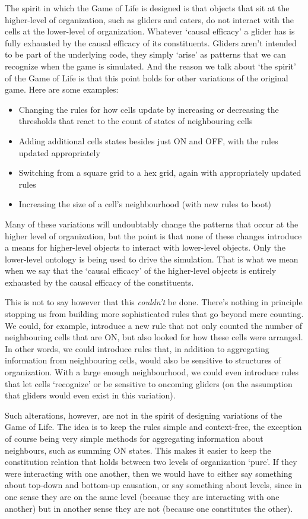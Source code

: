 \documentclass[11pt]{article}
\begin{document}
The spirit in which the Game of Life is designed is that objects that sit at the higher-level of organization, such as gliders and eaters, do not interact with the cells at the lower-level of organization.  Whatever `causal efficacy' a glider has is fully exhausted by the causal efficacy of its constituents. Gliders aren't intended to be part of the underlying code, they simply `arise' as patterns that we can recognize when the game is simulated.  And the reason we talk about `the spirit' of the Game of Life is that this point holds for other variations of the original game.  Here are some examples:
\begin{itemize}
	\item Changing the rules for how cells update by increasing or decreasing the thresholds that react to the count of states of neighbouring cells
	\item Adding additional cells states besides just ON and OFF, with the rules updated appropriately
	\item Switching from a square grid to a hex grid, again with appropriately updated rules
	\item Increasing the size of a cell's neighbourhood (with new rules to boot)
\end{itemize}
Many of these variations will undoubtably change the patterns that occur at the higher level of organization, but the point is that none of these changes introduce a means for higher-level objects to interact with lower-level objects. Only the lower-level ontology is being used to drive the simulation. That is what we mean when we say that the `causal efficacy' of the higher-level objects is entirely exhausted by the causal efficacy of the constituents. 

This is not to say however that this \emph{couldn't} be done. There's nothing in principle stopping us from building more sophisticated rules that go beyond mere counting. We could, for example, introduce a new rule that not only counted the number of neighbouring cells that are ON, but also looked for how these cells were arranged. In other words, we could introduce rules that, in addition to aggregating information from neighbouring cells, would also be sensitive to structures of organization.  With a large enough neighbourhood, we could even introduce rules that let cells `recognize' or be sensitive to oncoming gliders (on the assumption that gliders would even exist in this variation). 

Such alterations, however, are not in the spirit of designing variations of the Game of Life. The idea is to keep the rules simple and context-free, the exception of course being very simple methods for aggregating information about neighbours, such as summing ON states. This makes it easier to keep the constitution relation that holds between two levels of organization `pure'.  If they were interacting with one another, then we would have to either say something about top-down and bottom-up causation, or say something about levels, since in one sense they are on the same level (because they are interacting with one another) but in another sense they are not (because one constitutes the other).
\end{document}
